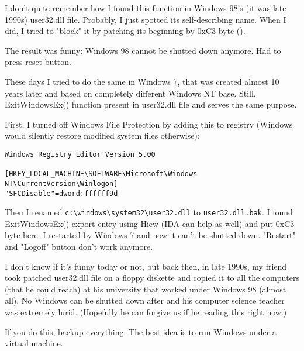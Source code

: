 
I don't quite remember how I found this function in Windows 98's (it was late 1990s) user32.dll file.
Probably, I just spotted its self-describing name.
When I did, I tried to "block" it by patching its beginning by 0xC3 byte ().

The result was funny: Windows 98 cannot be shutted down anymore.
Had to press reset button.

These days I tried to do the same in Windows 7, that was created almost 10 years later and based on completely different Windows NT
base.
Still, ExitWindowsEx() function present in user32.dll file and serves the same purpose.

First, I turned off Windows File Protection by adding this to registry (Windows would silently restore modified system files otherwise):

\begin{lstlisting}
Windows Registry Editor Version 5.00

[HKEY_LOCAL_MACHINE\SOFTWARE\Microsoft\Windows NT\CurrentVersion\Winlogon]
"SFCDisable"=dword:ffffff9d
\end{lstlisting}

Then I renamed \verb|c:\windows\system32\user32.dll| to \verb|user32.dll.bak|.
I found ExitWindowsEx() export entry using Hiew (IDA can help as well) and put 0xC3 byte here.
I restarted by Windows 7 and now it can't be shutted down.
"Restart" and "Logoff" button don't work anymore.

I don't know if it's funny today or not, but back then, in late 1990s, my friend took patched user32.dll file
on a floppy diskette and copied it to all the computers (that he could reach)
at his university that worked under Windows 98 (almost all).
No Windows can be shutted down after and his computer science teacher was extremely lurid.
(Hopefully he can forgive us if he reading this right now.)

If you do this, backup everything.
The best idea is to run Windows under a virtual machine.


